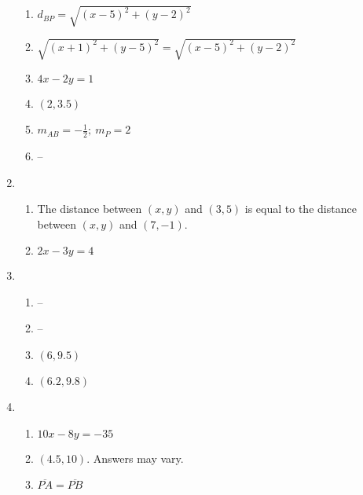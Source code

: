 \documentclass{article}
\begin{document}
\begin{enumerate}
\begin{enumerate}
	\item $d_{BP} = \sqrt{(x - 5)^2 + (y - 2)^2}$
	
	\item $\sqrt{(x + 1)^2 + ( y - 5)^2} = \sqrt{(x - 5)^2 + (y - 2)^2}$
	
	\item $4x - 2y = 1$
	
	\item $(2, 3.5)$
	
	\item $m_{AB} = -\frac{1}{2}; \ m_{P} = 2$
	
	\item --
	
	\end{enumerate}
	
\item 
	
	\begin{enumerate}
		
	\item The distance between $(x, y)$ and $(3, 5)$ is equal to the distance between $(x, y)$ and $(7, -1)$.
		
	\item $2x - 3y = 4$
		
	\end{enumerate}
	
\item 

	\begin{enumerate}
	
	\item --
	
	\item --
	
	\item $(6, 9.5)$
	
	\item $(6.2, 9.8)$
	
	\end{enumerate}
	
\item

	\begin{enumerate}
	
	\item $10x - 8y = -35$
	
	\item $(4.5, 10)$. Answers may vary.	
	
	\item $\overline{PA} = \overline{PB}$

	\end{enumerate}
	

\end{enumerate}
\end{document}

